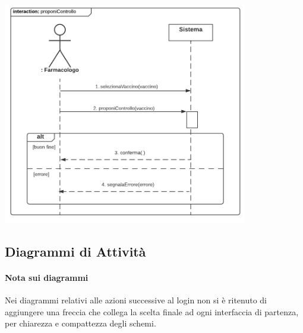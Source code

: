\documentclass[11pt]{article}
\begin{document}
                \begin{center}
                    \includegraphics[width=0.80\textwidth]{pictures/SDFarmacolo2_proponeControllo.png}
                \end{center}

    \newpage
        \subsection{Diagrammi di Attività}
            \paragraph*{Nota sui diagrammi}
            Nei diagrammi relativi alle azioni successive al login non si è ritenuto di aggiungere una freccia che collega la scelta finale ad ogni interfaccia di partenza, per chiarezza e compattezza degli schemi.\\
\end{document}
